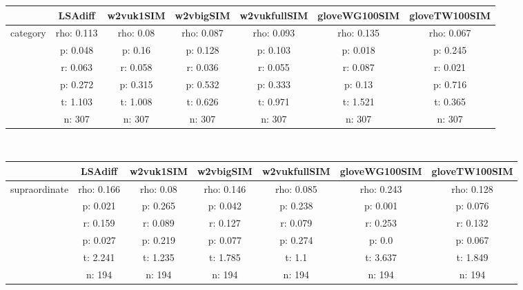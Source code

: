 \documentclass{article}
\begin{document}
\begin{tabular}{ccccccc|}\cline{2-7}
&\multicolumn{1}{|c}{LSAdiff} & w2vuk1SIM & w2vbigSIM & w2vukfullSIM & gloveWG100SIM & gloveTW100SIM \\\hline
\multicolumn{1}{|c|}{\multirow{6}{*}{category}} & rho: 0.113 & rho: 0.08 & rho: 0.087 & rho: 0.093 & rho: 0.135 & rho: 0.067 \\
\multicolumn{1}{|c|}{} & p: 0.048 & p: 0.16 & p: 0.128 & p: 0.103 & p: 0.018 & p: 0.245 \\
\multicolumn{1}{|c|}{} & r: 0.063 & r: 0.058 & r: 0.036 & r: 0.055 & r: 0.087 & r: 0.021 \\
\multicolumn{1}{|c|}{} & p: 0.272 & p: 0.315 & p: 0.532 & p: 0.333 & p: 0.13 & p: 0.716 \\
\multicolumn{1}{|c|}{} & t: 1.103 & t: 1.008 & t: 0.626 & t: 0.971 & t: 1.521 & t: 0.365 \\
\multicolumn{1}{|c|}{} & n: 307 & n: 307 & n: 307 & n: 307 & n: 307 & n: 307 \\
\hline
\end{tabular}\\
\begin{tabular}{ccccccc|}\cline{2-7}
&\multicolumn{1}{|c}{LSAdiff} & w2vuk1SIM & w2vbigSIM & w2vukfullSIM & gloveWG100SIM & gloveTW100SIM \\\hline
\multicolumn{1}{|c|}{\multirow{6}{*}{supraordinate}} & rho: 0.166 & rho: 0.08 & rho: 0.146 & rho: 0.085 & rho: 0.243 & rho: 0.128 \\
\multicolumn{1}{|c|}{} & p: 0.021 & p: 0.265 & p: 0.042 & p: 0.238 & p: 0.001 & p: 0.076 \\
\multicolumn{1}{|c|}{} & r: 0.159 & r: 0.089 & r: 0.127 & r: 0.079 & r: 0.253 & r: 0.132 \\
\multicolumn{1}{|c|}{} & p: 0.027 & p: 0.219 & p: 0.077 & p: 0.274 & p: 0.0 & p: 0.067 \\
\multicolumn{1}{|c|}{} & t: 2.241 & t: 1.235 & t: 1.785 & t: 1.1 & t: 3.637 & t: 1.849 \\
\multicolumn{1}{|c|}{} & n: 194 & n: 194 & n: 194 & n: 194 & n: 194 & n: 194 \\
\hline
\end{tabular}\\
\end{document}
